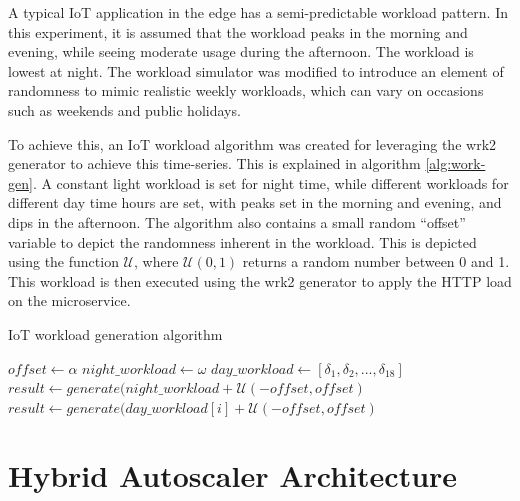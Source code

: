 A typical IoT application in the edge has a semi-predictable workload pattern. In this experiment, it is assumed that the workload peaks in the morning and evening, while seeing moderate usage during the afternoon. The workload is lowest at night. The workload simulator was modified to introduce an element of randomness to mimic realistic weekly workloads, which can vary on occasions such as weekends and public holidays.\par

To achieve this, an IoT workload algorithm was created for leveraging the wrk2 generator to achieve this time-series. This is explained in algorithm \ref{alg:work-gen}. A constant light workload is set for night time, while different workloads for different day time hours are set, with peaks set in the morning and evening, and dips in the afternoon. The algorithm also contains a small random ``offset'' variable to depict the randomness inherent in the workload. This is depicted using the function $\mathcal{U}$, where $\mathcal{U}(0,1)$ returns a random number between 0 and 1. This workload is then executed using the wrk2 generator to apply the HTTP load on the microservice.

\begin{algorithm}
    \caption{IoT workload generation algorithm}
    \label{alg:work-gen}
    \begin{algorithmic}
        \State $offset \gets \alpha$
        \State $night\_workload \gets \omega$
        \State $day\_workload \gets [ \delta_1, \delta_2, ... , \delta_{18}]$
                \State $result \gets generate(night\_workload + \mathcal{U}(-offset,offset)$
            \EndFor
                \State $result \gets generate(day\_workload[i] + \mathcal{U}(-offset,offset)$
            \EndFor
        \EndWhile
    \end{algorithmic}
\end{algorithm}

\section{Hybrid Autoscaler Architecture}
\label{ref:hybrid-auto-arch}


